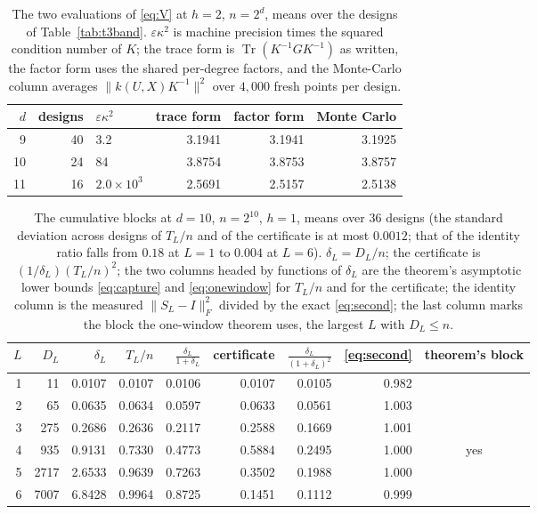 \documentclass[11pt]{article}
\theoremstyle{definition}
\DeclareMathOperator{\Tr}{Tr}
\newcommand{\numTthreeBlockDesigns}{36}
\newcommand{\numTthreeIdLfirst}{1}
\newcommand{\numTthreeIdLlast}{6}
\newcommand{\numTthreeIdSdFirst}{0.18}
\newcommand{\numTthreeIdSdLast}{0.004}
\newcommand{\numTthreeSdMax}{0.0012}
\begin{document}
\begin{table}[t]
\centering\small
\caption{The two evaluations of \eqref{eq:V} at $h=2$, $n=2^d$, means over the designs of
Table~\ref{tab:t3band}. $\varepsilon\kappa^2$ is machine precision times the squared condition
number of $K$; the trace form is $\Tr(K^{-1}GK^{-1})$ as written, the factor form uses the shared
per-degree factors, and the Monte-Carlo column averages $\|k(U,X)K^{-1}\|^2$ over $4{,}000$ fresh
points per design.}
\label{tab:traceform}
\begin{tabular}{rrlrrr}
\toprule
$d$ & designs & $\varepsilon\kappa^2$ & trace form & factor form & Monte Carlo\\
\midrule
9 & 40 & 3.2 & 3.1941 & 3.1941 & 3.1925\\
10 & 24 & 84 & 3.8754 & 3.8753 & 3.8757\\
11 & 16 & $2.0\times10^{3}$ & 2.5691 & 2.5157 & 2.5138\\
\bottomrule
\end{tabular}
\end{table}

\begin{table}[t]
\centering\small
\caption{The cumulative blocks at $d=10$, $n=2^{10}$, $h=1$, means over $\numTthreeBlockDesigns$
designs (the standard deviation across designs of $T_L/n$ and of the certificate is at most
$\numTthreeSdMax$; that of the identity ratio falls from $\numTthreeIdSdFirst$ at
$L=\numTthreeIdLfirst$ to $\numTthreeIdSdLast$ at $L=\numTthreeIdLlast$). $\delta_L=D_L/n$;
the certificate is $(1/\delta_L)(T_L/n)^2$; the two columns headed by functions of $\delta_L$ are the
theorem's asymptotic lower bounds \eqref{eq:capture} and \eqref{eq:onewindow} for $T_L/n$ and for the
certificate; the identity column is the measured $\|S_L-I\|_F^2$ divided by the exact
\eqref{eq:second}; the last column marks the block the one-window theorem uses, the largest $L$ with
$D_L\le n$.}
\label{tab:t3}
\begin{tabular}{rrrrrrrrc}
\toprule
$L$ & $D_L$ & $\delta_L$ & $T_L/n$ & $\frac{\delta_L}{1+\delta_L}$ & certificate &
$\frac{\delta_L}{(1+\delta_L)^2}$ & \eqref{eq:second} & theorem's block\\
\midrule
1 & 11 & 0.0107 & 0.0107 & 0.0106 & 0.0107 & 0.0105 & 0.982 & \\
2 & 65 & 0.0635 & 0.0634 & 0.0597 & 0.0633 & 0.0561 & 1.003 & \\
3 & 275 & 0.2686 & 0.2636 & 0.2117 & 0.2588 & 0.1669 & 1.001 & \\
4 & 935 & 0.9131 & 0.7330 & 0.4773 & 0.5884 & 0.2495 & 1.000 & yes\\
5 & 2717 & 2.6533 & 0.9639 & 0.7263 & 0.3502 & 0.1988 & 1.000 & \\
6 & 7007 & 6.8428 & 0.9964 & 0.8725 & 0.1451 & 0.1112 & 0.999 & \\
\bottomrule
\end{tabular}
\end{table}
\end{document}
